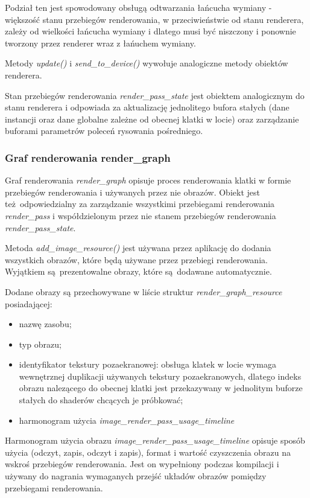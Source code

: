 Podział ten jest spowodowany obsługą odtwarzania łańcucha wymiany - większość stanu przebiegów renderowania, w przeciwieństwie od stanu renderera, zależy od wielkości łańcucha wymiany i dlatego musi być niszczony i ponownie tworzony przez renderer wraz z łańuchem wymiany.

Metody \textit{update()} i \textit{send\_to\_device()} wywołuje analogiczne metody obiektów renderera.

Stan przebiegów renderowania \textit{render\_pass\_state} jest obiektem analogicznym do stanu renderera i odpowiada za aktualizację jednolitego bufora stałych (dane instancji oraz dane globalne zależne od obecnej klatki w locie) oraz zarządzanie buforami parametrów poleceń rysowania pośredniego.


\subsubsection{Graf renderowania render\_graph}
Graf renderowania \textit{render\_graph} opisuje proces renderowania klatki w formie przebiegów renderowania i używanych przez nie obrazów.
Obiekt jest też odpowiedzialny za zarządzanie wszystkimi przebiegami renderowania \textit{render\_pass} i współdzielonym przez nie stanem przebiegów renderowania \textit{render\_pass\_state}.

Metoda \textit{add\_image\_resource()} jest używana przez aplikację do dodania wszystkich obrazów, które będą używane przez przebiegi renderowania. Wyjątkiem są prezentowalne obrazy, które są dodawane automatycznie.

Dodane obrazy są przechowywane w liście struktur \textit{render\_graph\_resource} posiadającej:
\begin{itemize}
	\item nazwę zasobu;
	\item typ obrazu;
	\item identyfikator tekstury pozaekranowej: obsługa klatek w locie wymaga wewnętrznej duplikacji używanych tekstury pozaekranowych, dlatego indeks obrazu nalezącego do obecnej klatki jest przekazywany w jednolitym buforze stałych do shaderów chcących je próbkować;
	\item harmonogram użycia \textit{image\_render\_pass\_usage\_timeline}
\end{itemize}

Harmonogram użycia obrazu \textit{image\_render\_pass\_usage\_timeline} opisuje sposób użycia (odczyt, zapis, odczyt i zapis), format i wartość czyszczenia obrazu na wskroś przebiegów renderowania.
Jest on wypełniony podczas kompilacji i używany do nagrania wymaganych przejść układów obrazów pomiędzy przebiegami renderowania.

